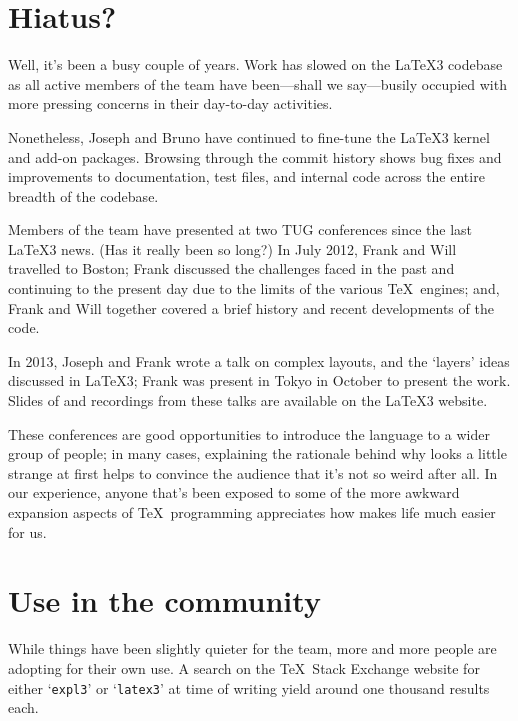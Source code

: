 \documentclass{ltnews}
\begin{document}
\maketitle

\raisefirstsection
\tableofcontents     %

\section{Hiatus?}

Well, it's been a busy couple of years.
Work has slowed on the \LaTeX3 codebase as all active members of the team have been---shall we say---busily occupied with more pressing concerns in their day-to-day activities.

Nonetheless, Joseph and Bruno have continued to fine-tune the \LaTeX3 kernel and add-on packages.
Browsing through the commit history shows bug fixes and improvements to documentation, test files, and internal code across the entire breadth of the codebase.

Members of the team have presented at two TUG conferences since the last \LaTeX3 news. (Has it really been so long?)
In July 2012, Frank and Will travelled to Boston; Frank discussed the challenges faced in the past and continuing to the present day due to the limits of the various \TeX\ engines; and, Frank and Will together covered a brief history and recent developments of the  code.

In 2013, Joseph and Frank wrote a talk on complex layouts, and the `layers' ideas discussed in \LaTeX3; Frank was present in Tokyo in October to present the work.
Slides of and recordings from these talks are available on the \LaTeX3 website.

These conferences are good opportunities to introduce the  language to a wider group of people; in many cases, explaining the rationale behind why  looks a little strange at first helps to convince the audience that it's not so weird after all.
In our experience, anyone that's been exposed to some of the more awkward expansion aspects of \TeX\ programming appreciates how  makes life much easier for us.

\section{Use in the community}

While things have been slightly quieter for the team, more and more people are adopting  for their own use.
A search on the \TeX\ Stack Exchange website for either `\texttt{expl3}' or `\texttt{latex3}' at time of writing yield around one thousand results each.
\end{document}

